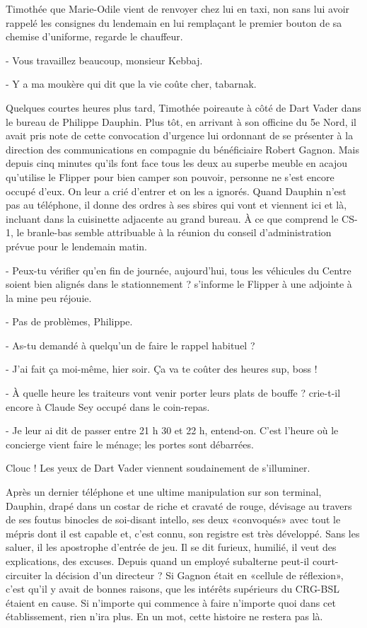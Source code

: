 Timothée que Marie-Odile vient de renvoyer chez lui en taxi, non sans lui avoir rappelé les consignes du lendemain en lui remplaçant le premier bouton de sa chemise d’uniforme, regarde le chauffeur.

- Vous travaillez beaucoup, monsieur Kebbaj.

- Y a ma moukère qui dit que la vie coûte cher, tabarnak.

Quelques courtes heures plus tard, Timothée poireaute à côté de Dart Vader dans le bureau de Philippe Dauphin. Plus tôt, en arrivant à son officine du 5e Nord, il avait pris note de cette convocation d’urgence lui ordonnant de se présenter à la direction des communications en compagnie du bénéficiaire Robert Gagnon. Mais depuis cinq minutes qu’ils font face tous les deux au superbe meuble en acajou qu’utilise le Flipper pour bien camper son pouvoir, personne ne s’est encore occupé d’eux. On leur a crié d’entrer et on les a ignorés. Quand Dauphin n’est pas au téléphone, il donne des ordres à ses sbires qui vont et viennent ici et là, incluant dans la cuisinette adjacente au grand bureau. À ce que comprend le CS-1, le branle-bas semble attribuable à la réunion du conseil d’administration prévue pour le lendemain matin.

- Peux-tu vérifier qu’en fin de journée, aujourd’hui, tous les véhicules du Centre soient bien alignés dans le stationnement ? s’informe le Flipper à une adjointe à la mine peu réjouie.

- Pas de problèmes, Philippe.

- As-tu demandé à quelqu’un de faire le rappel habituel ?

- J’ai fait ça moi-même, hier soir. Ça va te coûter des heures sup, boss !

- À quelle heure les traiteurs vont venir porter leurs plats de bouffe ? crie-t-il encore à Claude Sey occupé dans le coin-repas.

- Je leur ai dit de passer entre 21 h 30 et 22 h, entend-on. C’est l’heure où le concierge vient faire le ménage; les portes sont débarrées.

Clouc ! Les yeux de Dart Vader viennent soudainement de s’illuminer.

Après un dernier téléphone et une ultime manipulation sur son terminal, Dauphin, drapé dans un costar de riche et cravaté de rouge, dévisage au travers de ses foutus binocles de soi-disant intello, ses deux «convoqués» avec tout le mépris dont il est capable et, c’est connu, son registre est très développé. Sans les saluer, il les apostrophe d’entrée de jeu. Il se dit furieux, humilié, il veut des explications, des excuses. Depuis quand un employé subalterne peut-il court-circuiter la décision d’un directeur ? Si Gagnon était en «cellule de réflexion», c’est qu’il y avait de bonnes raisons, que les intérêts supérieurs du CRG-BSL étaient en cause. Si n’importe qui commence à faire n’importe quoi dans cet établissement, rien n’ira plus. En un mot, cette histoire ne restera pas là.

